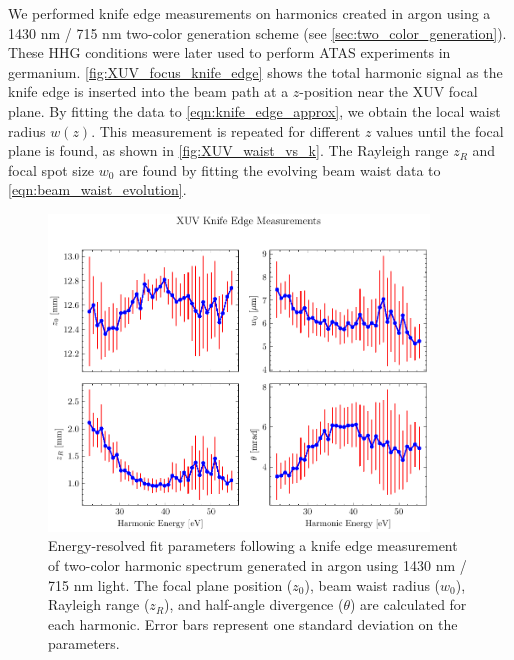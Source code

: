 We performed knife edge measurements on harmonics created in argon using a 1430 nm / 715 nm two-color generation scheme (see \cref{sec:two_color_generation}). These HHG conditions were later used to perform ATAS experiments in germanium. \cref{fig:XUV_focus_knife_edge} shows the total harmonic signal as the knife edge is inserted into the beam path at a $z$-position near the XUV focal plane. By fitting the data to \cref{eqn:knife_edge_approx}, we obtain the local waist radius $w(z)$. This measurement is repeated for different $z$ values until the focal plane is found, as shown in \cref{fig:XUV_waist_vs_k}. The Rayleigh range $z_R$ and focal spot size $w_0$ are found by fitting the evolving beam waist data to \cref{eqn:beam_waist_evolution}.


\begin{figure}
	\centering
	\includegraphics[width=0.9\textwidth]{figures/chap3/knife_edge_fit_2x2.pdf}
	\caption{Energy-resolved fit parameters following a knife edge measurement of two-color harmonic spectrum generated in argon using 1430 nm / 715 nm light. The focal plane position ($z_0$), beam waist radius ($w_0$), Rayleigh range ($z_R$), and half-angle divergence ($\theta$) are calculated for each harmonic. Error bars represent one standard deviation on the parameters.}
	\label{fig:knife_edge_fit_2x2}
\end{figure}


